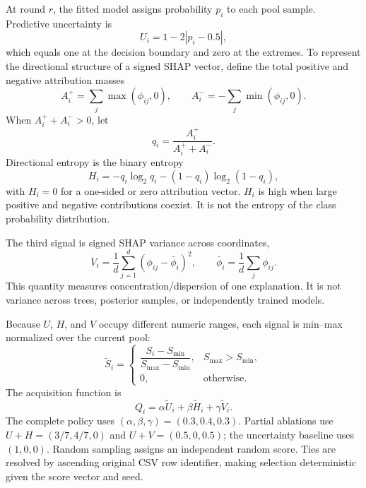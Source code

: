 At round $r$, the fitted model assigns probability $p_i$ to each pool sample.
Predictive uncertainty is
\begin{equation}
U_i=1-2|p_i-0.5|,
\label{eq:uncertainty}
\end{equation}
which equals one at the decision boundary and zero at the extremes. To represent
the directional structure of a signed SHAP vector, define the total positive and
negative attribution masses
\begin{equation}
A_i^+=\sum_j\max(\phi_{ij},0),\qquad
A_i^-=-\sum_j\min(\phi_{ij},0).
\end{equation}
When $A_i^++A_i^->0$, let
\begin{equation}
q_i=\frac{A_i^+}{A_i^++A_i^-}.
\end{equation}
Directional entropy is the binary entropy
\begin{equation}
H_i=-q_i\log_2 q_i-(1-q_i)\log_2(1-q_i),
\label{eq:entropy}
\end{equation}
with $H_i=0$ for a one-sided or zero attribution vector. $H_i$ is high when
large positive and negative contributions coexist. It is not the entropy of the
class probability distribution.

The third signal is signed SHAP variance across coordinates,
\begin{equation}
V_i=\frac{1}{d}\sum_{j=1}^{d}(\phi_{ij}-\bar{\phi}_i)^2,
\qquad
\bar{\phi}_i=\frac{1}{d}\sum_j\phi_{ij}.
\label{eq:variance}
\end{equation}
This quantity measures concentration/dispersion of one explanation. It is not
variance across trees, posterior samples, or independently trained models.

Because $U$, $H$, and $V$ occupy different numeric ranges, each signal is
min--max normalized over the current pool:
\begin{equation}
\widetilde{S}_i=\begin{cases}
\dfrac{S_i-S_{\min}}{S_{\max}-S_{\min}}, & S_{\max}>S_{\min},\\
0, & \text{otherwise}.
\end{cases}
\label{eq:normalize}
\end{equation}
The acquisition function is
\begin{equation}
Q_i=\alpha\widetilde{U}_i+\beta\widetilde{H}_i+
\gamma\widetilde{V}_i.
\label{eq:query}
\end{equation}
The complete policy uses $(\alpha,\beta,\gamma)=(0.3,0.4,0.3)$. Partial
ablations use $U+H=(3/7,4/7,0)$ and $U+V=(0.5,0,0.5)$; the uncertainty baseline
uses $(1,0,0)$. Random sampling assigns an independent random score. Ties are
resolved by ascending original CSV row identifier, making selection deterministic
given the score vector and seed.

